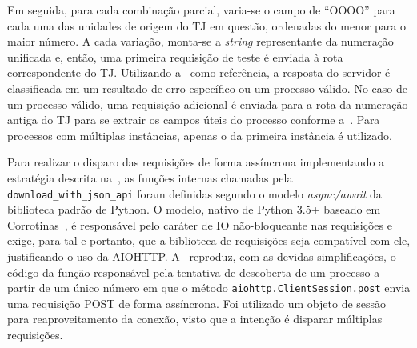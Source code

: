 Em seguida, para cada combinação parcial, varia-se o campo de ``OOOO'' para
cada uma das unidades de origem do TJ em questão, ordenadas do menor para o
maior número. A cada variação, monta-se a \textit{string} representante da
numeração unificada e, então, uma primeira requisição de teste é enviada à rota
correspondente do TJ. Utilizando a~ como referência, a
resposta do servidor é classificada em um resultado de erro específico ou um
processo válido. No caso de um processo válido, uma requisição adicional é
enviada para a rota da numeração antiga do TJ para se extrair os campos úteis
do processo conforme a~. Para processos
com múltiplas instâncias, apenas o da primeira instância é utilizado.

\begin{algorithm}
    \caption{%
        Extração de processos via API JSON (simplificada).
    }
    \label{alg:iteração-por-combinações}
\end{algorithm}


Para realizar o disparo das requisições de forma assíncrona implementando a
estratégia descrita na~, as funções internas
chamadas pela \texttt{download_with_json_api} foram definidas
segundo o modelo \textit{async/await} da biblioteca padrão de Python. O modelo,
nativo de Python 3.5+ baseado em Corrotinas~\cite{spec:pep0492}, é responsável
pelo caráter de IO não-bloqueante nas requisições e exige, para tal e portanto,
que a biblioteca de requisições seja compatível com ele, justificando o uso da
AIOHTTP. A~ reproduz, com
as devidas simplificações, o código da função responsável pela tentativa de
descoberta de um processo a partir de um único número em que o método
\texttt{aiohttp.ClientSession.post} envia uma requisição POST de
forma assíncrona. Foi utilizado um objeto de sessão para reaproveitamento da
conexão, visto que a intenção é disparar múltiplas requisições.

